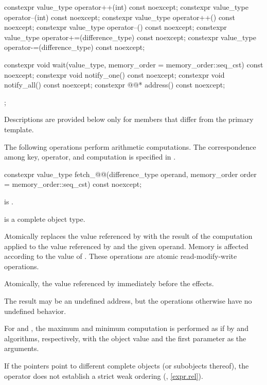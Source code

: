 \begin{codeblock}
{{    constexpr value_type operator++(int) const noexcept;
    constexpr value_type operator--(int) const noexcept;
    constexpr value_type operator++() const noexcept;
    constexpr value_type operator--() const noexcept;
    constexpr value_type operator+=(difference_type) const noexcept;
    constexpr value_type operator-=(difference_type) const noexcept;

    constexpr void wait(value_type, memory_order = memory_order::seq_cst) const noexcept;
    constexpr void notify_one() const noexcept;
    constexpr void notify_all() const noexcept;
    constexpr @@* address() const noexcept;
  };
}
\end{codeblock}

\pnum
Descriptions are provided below only for members
that differ from the primary template.

\pnum
The following operations perform arithmetic computations.
The correspondence among key, operator, and computation is specified
in .

%
%
%
%
\begin{itemdecl}
constexpr value_type fetch_@@(difference_type operand,
                     memory_order order = memory_order::seq_cst) const noexcept;
\end{itemdecl}

\begin{itemdescr}
\pnum
\constraints
{} is .

\pnum
\mandates
{} is a complete object type.

\pnum
\effects
Atomically replaces the value referenced by  with
the result of the computation applied to the value referenced by 
and the given operand.
Memory is affected according to the value of .
These operations are atomic read-modify-write operations.

\pnum
\returns
Atomically, the value referenced by 
immediately before the effects.

\pnum
\remarks
The result may be an undefined address,
but the operations otherwise have no undefined behavior.

\pnum
For  and , the maximum and minimum
computation is performed as if by  and 
algorithms, respectively, with the object value and the first
parameter as the arguments.

\begin{note}
If the pointers point to different complete objects (or subobjects thereof),
the \tcode{<} operator does not establish a strict weak ordering
(, \ref{expr.rel}).
\end{note}
\end{itemdescr}

